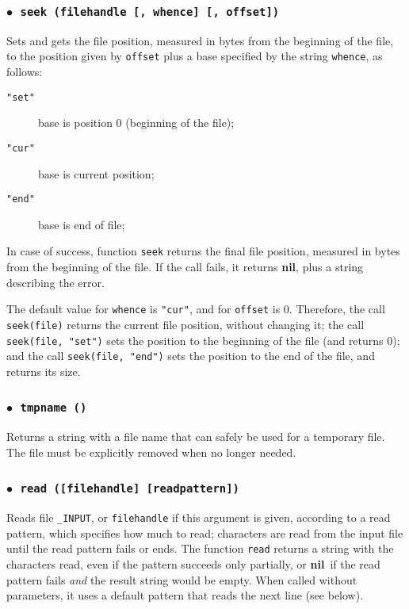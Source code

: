 \documentclass[11pt]{article}
\newcommand{\T}[1]{{\tt #1}}
\newcommand{\nil}{{\bf nil}}
\newcommand{\Deffunc}[1]{\index{#1}}
\newcommand{\ff}{$\bullet$\ }
\begin{document}
\subsubsection*{\ff \T{seek (filehandle [, whence] [, offset])}}\Deffunc{seek}

Sets and gets the file position,
measured in bytes from the beginning of the file,
to the position given by \verb|offset| plus a base
specified by the string \verb|whence|, as follows:
\begin{description}
\item[\tt "set"] base is position 0 (beginning of the file);
\item[\tt "cur"] base is current position;
\item[\tt "end"] base is end of file;
\end{description}
In case of success, function \verb|seek| returns the final file position,
measured in bytes from the beginning of the file.
If the call fails, it returns \nil,
plus a string describing the error.

The default value for \verb|whence| is \verb|"cur"|,
and for \verb|offset| is 0.
Therefore, the call \verb|seek(file)| returns the current
file position, without changing it;
the call \verb|seek(file, "set")| sets the position to the
beginning of the file (and returns 0);
and the call \verb|seek(file, "end")| sets the position to the
end of the file, and returns its size.

\subsubsection*{\ff \T{tmpname ()}}\Deffunc{tmpname}

Returns a string with a file name that can safely
be used for a temporary file.
The file must be explicitly removed when no longer needed.

\subsubsection*{\ff \T{read ([filehandle] [readpattern])}}\Deffunc{read}

Reads file \verb|_INPUT|,
or \verb|filehandle| if this argument is given,
according to a read pattern, which specifies how much to read;
characters are read from the input file until
the read pattern fails or ends.
The function \verb|read| returns a string with the characters read,
even if the pattern succeeds only partially,
or \nil\ if the read pattern fails \emph{and}
the result string would be empty.
When called without parameters,
it uses a default pattern that reads the next line
(see below).
\end{document}
